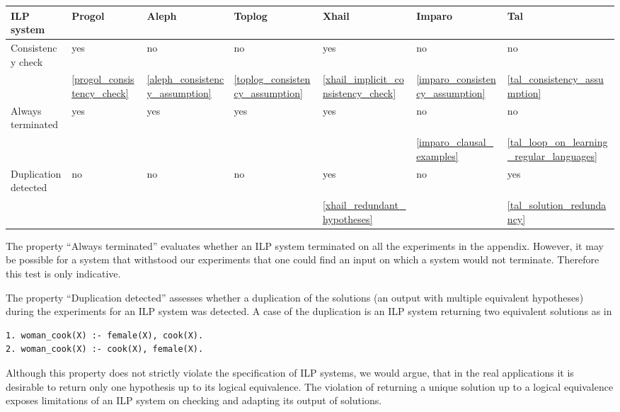 \begin{center}
 \label{classification_robustness} 
\begin{tabular}{| l | l | l | l | l | l | l |}
    \hline
    ILP system & Progol & Aleph & Toplog & Xhail & Imparo & Tal \\ \hline
    Consistency check & yes & no & no & yes & no & no \\
	& \ref{progol_consistency_check}
	& \ref{aleph_consistency_assumption}
	& \ref{toplog_consistency_assumption}
	 & \ref{xhail_implicit_consistency_check}
	 & \ref{imparo_consistency_assumption}
	 & \ref{tal_consistency_assumption} \\ \hline
    Always terminated & yes & yes & yes & yes & no & no \\ 
	&  & & & & \ref{imparo_clausal_examples} & \ref{tal_loop_on_learning_regular_languages} \\ \hline
	
	    Duplication detected & no & no & no & yes & no & yes \\ 
	&  & & 
	&\ref{xhail_redundant_hypotheses}
	& 
	&\ref{tal_solution_redundancy}\\ \hline

\end{tabular}
\end{center} 

The property ``Always terminated'' evaluates whether an ILP system terminated on all the experiments in the appendix. However, it may be possible for a system that withstood our experiments that one could find an input on which a system would not terminate. Therefore this test is only indicative.

The property ``Duplication detected'' assesses whether a duplication of the solutions
(an output with multiple equivalent hypotheses)
during the experiments for an ILP system was detected.
A case of the duplication is an ILP system returning two equivalent solutions as in
\begin{lstlisting}
1. woman_cook(X) :- female(X), cook(X).
2. woman_cook(X) :- cook(X), female(X).
\end{lstlisting}
Although this property does not strictly violate the specification of ILP systems, we would argue, that in the real applications it is desirable to return only one hypothesis up to its logical equivalence. The violation of returning a unique solution up to a logical equivalence exposes limitations of an ILP system on checking and adapting its output of solutions.

